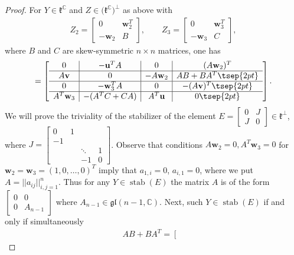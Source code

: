 \documentclass[pdftex]{sigma}
\numberwithin{equation}{section}
\begin{document}
\begin{proof}
For $Y\in\mathfrak{k}^\mathbb{C}$ and $Z\in\big(\mathfrak{k}^\mathbb{C}\big)^\perp$ as above with
\begin{gather*} Z_2=\left[ \begin {array}{c|c} 0&\mathbf{w}^T_2 \\ \hline -{\mathbf{w}}_2& B \end {array} \right] , \qquad Z_3=\left[ \begin {array}{c|c} 0&\mathbf{w}^T_3 \\ \hline -{\mathbf{w}}_3& C \end {array} \right],
\end{gather*}
where $B$ and $C$ are skew-symmetric $n\times n$ matrices, one has
\begin{gather*}
[Y,Z]=\left[
\begin{array}{c|c|c|c}
0&-\mathbf{u}^TA&0& (A\mathbf{w}_2)^T \\ \hline
A\mathbf{v}&0&-A\mathbf{w}_2&AB+BA^T \tsep{2pt}\\ \hline
0&-\mathbf{w}_3^TA&0&-(A\mathbf{v})^T \tsep{2pt}\\ \hline
A^T \mathbf{w}_3&-(A^TC+CA)&A^T \mathbf{u}&0\tsep{2pt}
\end{array} \right].
\end{gather*}
We will prove the triviality of the stabilizer of the element
$E=\left[ \begin{array}{c|c}
0 & J \\ \hline
J & 0
\end{array} \right]\in \mathfrak{k}^\perp $,
where $J=
\left[ \begin {smallmatrix}%
0		& 1				& 			& \\
-1 		&				& 			& \\
& 				& \ddots	& 1 \\
& 				& -1		& 0
\end{smallmatrix} \right] $.
Observe that conditions $A\mathbf{w}_2=0,A^T \mathbf{w}_3=0$ for $\mathbf{w}_2=\mathbf{w}_3=(1,0,\dots,0)^T$ imply that $a_{1,i}=0$, $a_{i,1}=0$, where we put $A=||a_{ij}||_{i,j=1}^n$. Thus for any $Y\in \operatorname{stab}(E)$ the
matrix $A$ is of the form $\left[
\begin {array}{c|c} 0&0 \\ \hline 0& A_{n-1} \end {array} \right]$ where $ A_{n-1} \in\mathfrak{gl}(n-1,\mathbb{C})$.
Next, such $Y \in \operatorname{stab}(E)$ if and only if simultaneously
\begin{gather*} AB+BA^T=\left[ \begin{matrix}%

\end{matrix}
\end{gather*}
\end{proof}
\end{document}
